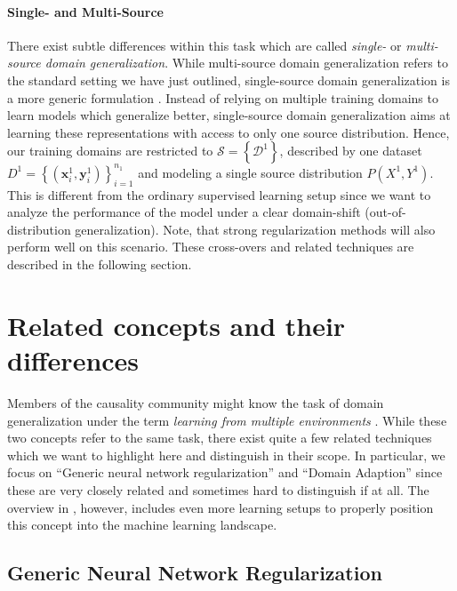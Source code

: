 \paragraph{Single- and Multi-Source}
There exist subtle differences within this task which are called \emph{single-} or \emph{multi-source domain generalization}. While multi-source domain generalization refers to the standard setting we have just outlined, single-source domain generalization is a more generic formulation \citep{zunino2020explainable}. Instead of relying on multiple training domains to learn models which generalize better, single-source domain generalization aims at learning these representations with access to only one source distribution. Hence, our training domains are restricted to $\mathcal{S} = \left\{\mathcal{D}^{1}\right\}$, described by one dataset $D^1=\left\{\left(\mathbf{x}^1_{i}, \mathbf{y}^1_{i}\right)\right\}_{i=1}^{n_{1}}$ and modeling a single source distribution $P\left(X^1, Y^1\right)$. This is different from the ordinary supervised learning setup since we want to analyze the performance of the model under a clear domain-shift (\ie out-of-distribution generalization). Note, that strong regularization methods will also perform well on this scenario. These cross-overs and related techniques are described in the following section.

\section{Related concepts and their differences}

Members of the causality community might know the task of domain generalization under the term \emph{learning from multiple environments} \citep{arjovsky2019invariant, gulrajani2020search, PetBuhMei15}. While these two concepts refer to the same task, there exist quite a few related techniques which we want to highlight here and distinguish in their scope. In particular, we focus on ``Generic neural network regularization'' and ``Domain Adaption'' since these are very closely related and sometimes hard to distinguish if at all. The overview in , however, includes even more learning setups to properly position this concept into the machine learning landscape.

\subsection{Generic Neural Network Regularization}

